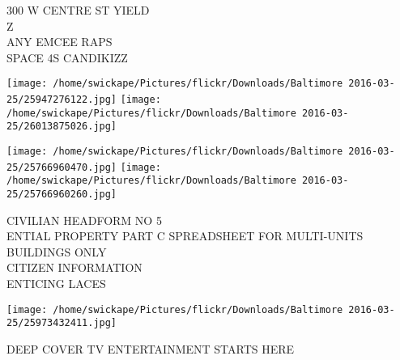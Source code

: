 \documentclass[10pt,letterpaper]{article}
\begin{document}
300 W CENTRE ST YIELD\\
Z\\
ANY EMCEE RAPS\\
SPACE 4S CANDIKIZZ\\
\pagebreak

\texttt{[image: /home/swickape/Pictures/flickr/Downloads/Baltimore 2016-03-25/25947276122.jpg]}
\texttt{[image: /home/swickape/Pictures/flickr/Downloads/Baltimore 2016-03-25/26013875026.jpg]}

\texttt{[image: /home/swickape/Pictures/flickr/Downloads/Baltimore 2016-03-25/25766960470.jpg]}
\texttt{[image: /home/swickape/Pictures/flickr/Downloads/Baltimore 2016-03-25/25766960260.jpg]}

CIVILIAN HEADFORM NO 5\\
ENTIAL PROPERTY PART C SPREADSHEET FOR MULTI{-}UNITS BUILDINGS ONLY\\
CITIZEN INFORMATION\\
ENTICING LACES\\
\pagebreak

\texttt{[image: /home/swickape/Pictures/flickr/Downloads/Baltimore 2016-03-25/25973432411.jpg]}

DEEP COVER TV ENTERTAINMENT STARTS HERE\\
\pagebreak
\end{document}
